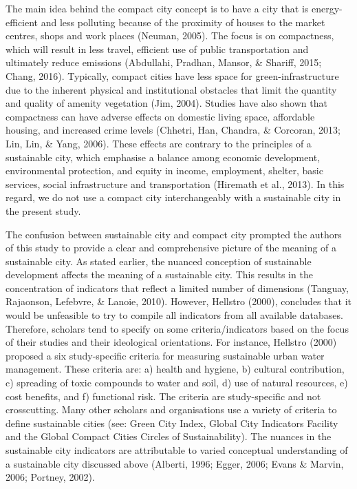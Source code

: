 The main idea behind the compact city concept is to have a city that is energy-efficient and less polluting because of the proximity of houses to the market centres, shops and work places (Neuman, 2005). The focus is on compactness, which will result in less travel, efficient use of public transportation and ultimately reduce emissions (Abdullahi, Pradhan, Mansor, \& Shariff, 2015; Chang, 2016). Typically, compact cities have less space for green-infrastructure due to the inherent physical and institutional obstacles that limit the quantity and quality of amenity vegetation (Jim, 2004). Studies have also shown that compactness can have adverse effects on domestic living space, affordable housing, and increased crime levels (Chhetri, Han, Chandra, \& Corcoran, 2013; Lin, Lin, \& Yang, 2006). These effects are contrary to the principles of a sustainable city, which emphasise a balance among economic development, environmental protection, and equity in income, employment, shelter, basic services, social infrastructure and transportation (Hiremath et al., 2013). In this regard, we do not use a compact city interchangeably with a sustainable city in the present study.

The confusion between sustainable city and compact city prompted the authors of this study to provide a clear and comprehensive picture  of the meaning of a sustainable city. As stated earlier, the nuanced conception of sustainable development affects the meaning of a sustainable city. This results in the concentration of indicators that reflect a limited number of dimensions (Tanguay, Rajaonson, Lefebvre, \& Lanoie, 2010). However, Hellstro (2000), concludes that it would be unfeasible to try to compile all indicators from all available databases. Therefore, scholars tend to specify on some criteria/indicators based on the focus of their studies and their ideological orientations. For instance, Hellstro (2000) proposed a six study-specific criteria for measuring sustainable urban water management. These criteria are: a) health and hygiene, b) cultural contribution, c) spreading of toxic compounds to water and soil, d) use of natural resources, e) cost benefits, and f) functional risk. The criteria are study-specific and not crosscutting. Many other scholars and organisations use a variety of criteria to define sustainable cities (see: Green City Index, Global City Indicators Facility and the Global Compact Cities Circles of Sustainability). The nuances in the sustainable city indicators are attributable to varied conceptual understanding of a sustainable city discussed above (Alberti, 1996; Egger, 2006; Evans \& Marvin, 2006; Portney, 2002).


